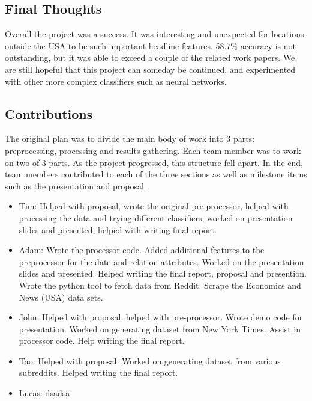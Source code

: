 \documentclass[11pt,a4paper]{article}
\begin{document}
\subsection{Final Thoughts}
 Overall the project was a success. It was interesting and unexpected for locations outside the USA to be such important headline features. 58.7\% accuracy is not outstanding, but it was able to exceed a couple of the related work papers. We are still hopeful that this project can someday be continued, and experimented with other more complex classifiers such as neural networks.


\subsection{Contributions}
The original plan was to divide the main body of work into 3 parts: preprocessing, processing and results gathering. Each team member was to work on two of 3 parts. As the project progressed, this structure fell apart. In the end, team members contributed to each of the three sections as well as milestone items such as the presentation and proposal.\\

\begin{itemize}
\item Tim: Helped with proposal, wrote the original pre-processor, helped with processing the data and trying different classifiers, worked on presentation slides and presented, helped with writing final report.\\

\item Adam: Wrote the processor code. Added additional features to the preprocessor for the date and relation attributes. Worked on the presentation slides and presented. Helped writing the final report, proposal and presention. Wrote the python tool to fetch data from Reddit. Scrape the Economics and News (USA) data sets.\\

\item John: Helped with proposal, helped with pre-processor. Wrote demo code for presentation. Worked on generating dataset from New York Times. Assist in processor code. Help writing the final report.\\

\item Tao: Helped with proposal. Worked on generating dataset from various subreddits. Helped writing the final report.

\item Lucas: dsadsa
\end{itemize}
\end{document}

